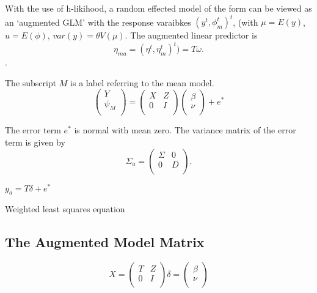\documentclass[12pt, a4paper]{report}
\theoremstyle{plain}
\theoremstyle{definition}
\theoremstyle{remark}
\begin{document}
	With the use of h-likihood, a random effected model of the form can be viewed as an `augmented GLM' with the response varaibkes $(y^t, \phi^t_m)^t$, (with $\mu = E(y)$,$ u = E(\phi)$, $var(y) = \theta V (\mu)$.
	The augmented linear predictor is \[\eta_{ma}  = (\eta^t, \eta^t_m)^t) = T\omega. \].
	
	
	
	
	The subscript $M$ is a label referring to the mean model.
	\begin{equation}
	\left(%
	\begin{array}{c}
	Y \\
	\psi_{M} \\
	\end{array}%
	\right) = \left(
	\begin{array}{cc}
	X & Z \\
	0 & I \\
	\end{array}\right) \left(%
	\begin{array}{c}
	\beta \\
	\nu \\
	\end{array}%
	\right)+ e^{*}
	\end{equation}
	
	
	
	
	The error term $e^{*}$ is normal with mean zero. The variance matrix of the error term is given by
	\begin{equation}
	\Sigma_{a} = \left(%
	\begin{array}{cc}
	\Sigma & 0 \\
	0 & D \\
	\end{array}%
	\right).
	\end{equation}
	
	$y_{a} = T \delta + e^{*}$
	
	Weighted least squares equation
	
	
	
	
	\subsection{The Augmented Model Matrix}  %
	\begin{equation}
	X = \left(%
	\begin{array}{cc}
	T & Z \\
	0 & I \\
	\end{array}%
	\right)
	\delta = \left(%
	\begin{array}{c}
	\beta  \\
	\nu  \\
	\end{array}%
	\right)
	\end{equation}
	
\end{document}
